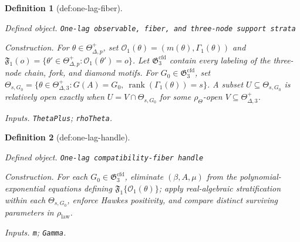 \documentclass{article}
\newtheorem{definition}{Definition}
\begin{document}
\begin{definition}[def:one-lag-fiber]\label{def:one-lag-fiber}
\par\smallskip\noindent\emph{Defined object.} \texttt{One-\allowbreak{}lag observable,\allowbreak{} fiber,\allowbreak{} and three-\allowbreak{}node support strata}
\par\smallskip\noindent\emph{Construction.} For \(\theta\in\Theta_{\Delta,p}^{+}\), set \(\mathcal O_1(\theta)=(m(\theta),\Gamma_1(\theta))\) and \(\mathfrak F_1(o)=\{\theta'\in\Theta_{\Delta,p}^{+}:\mathcal O_1(\theta')=o\}\). Let \(\mathfrak G_3^{\mathrm{cfd}}\) contain every labeling of the three-node chain, fork, and diamond motifs. For \(G_0\in\mathfrak G_3^{\mathrm{cfd}}\), set \(\Theta_{s,G_0}=\{\theta\in\Theta_{\Delta,3}^{+}:G(A)=G_0,\ \operatorname{rank}(\Gamma_1(\theta))=s\}\). A subset \(U\subseteq\Theta_{s,G_0}\) is relatively open exactly when \(U=V\cap\Theta_{s,G_0}\) for some \(\rho_{\Theta}\)-open \(V\subseteq\Theta_{\Delta,3}^{+}\).
\par\smallskip\noindent\emph{Inputs.} \texttt{ThetaPlus}; \texttt{rhoTheta}.
\end{definition}

\begin{definition}[def:one-lag-handle]\label{def:one-lag-handle}
\par\smallskip\noindent\emph{Defined object.} \texttt{One-\allowbreak{}lag compatibility-\allowbreak{}fiber handle}
\par\smallskip\noindent\emph{Construction.} For each \(G_0\in\mathfrak G_3^{\mathrm{cfd}}\), eliminate \((\beta,A,\mu)\) from the polynomial-exponential equations defining \(\mathfrak F_1\{\mathcal O_1(\theta)\}\); apply real-algebraic stratification within each \(\Theta_{s,G_0}\), enforce Hawkes positivity, and compare distinct surviving parameters in \(\rho_{\mathrm{law}}\).
\par\smallskip\noindent\emph{Inputs.} \texttt{m}; \texttt{Gamma}.
\end{definition}
\end{document}
